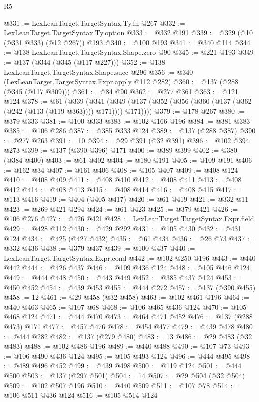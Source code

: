 \begin{lexlean}{R5}
\begin{coremodule}
@331 := LexLeanTarget.TargetSyntax.Ty.fn @267
@332 := LexLeanTarget.TargetSyntax.Ty.option
@333 := @332 @191
@339 := @329 (@10 (@331 @333) (@12 @267)) @193
@340 := @100 @193
@341 := @340 @114
@344 := @138 LexLeanTarget.TargetSyntax.Shape.zero @90
@345 := @221 @193
@349 := @137 (@344 (@345 (@117 @227)))
@352 := @138 LexLeanTarget.TargetSyntax.Shape.succ @296
@356 := @340 (LexLeanTarget.TargetSyntax.Expr.apply @112 @282)
@360 := @137 (@288 (@345 (@117 @309)))
@361 := @84 @90
@362 := @277 @361
@363 := @121 @124
@378 := @61
    (@339
      (@341 (@349 (@137 (@352 (@356 (@360 (@137 (@362 (@242 (@113 (@119 @363)))) @171)))) @171))))
@379 := @178 @267
@380 := @379 @333
@381 := @100 @333
@383 := @102 @166 @196
@384 := @381 @383
@385 := @106 @286
@387 := @385 @333 @124
@389 := @137 (@288 @387)
@390 := @277 @263
@391 := 10
@394 := @29 @391 (@32 @391)
@396 := @102 @394 @273
@399 := @137 (@390 @396) @171
@400 := @389 @399
@402 := @380 (@384 @400)
@403 := @61 @402
@404 := @180 @191
@405 := @109 @191
@406 := @162 @34
@407 := @161 @406
@408 := @105 @407
@409 := @408 @124
@410 := @408 @409
@411 := @408 @410
@412 := @408 @411
@413 := @408 @412
@414 := @408 @413
@415 := @408 @414
@416 := @408 @415
@417 := @113 @416
@419 := @404 (@405 @417)
@420 := @61 @419
@421 := @332 @11
@423 := @269 @421 @294
@424 := @61 @423
@425 := @379 @421
@426 := @106 @276
@427 := @426 @421
@428 := LexLeanTarget.TargetSyntax.Expr.field
@429 := @428 @112
@430 := @429 @292
@431 := @105 @430
@432 := @431 @124
@434 := @425 (@427 @432)
@435 := @61 @434
@436 := @26 @73
@437 := @332 @436
@438 := @379 @437
@439 := @100 @437
@440 := LexLeanTarget.TargetSyntax.Expr.cond
@442 := @102 @250 @196
@443 := @440 @442
@444 := @426 @437
@446 := @109 @436 @124
@448 := @105 @446 @124
@449 := @444 @448
@450 := @443 @449
@452 := @385 @437 @124
@453 := @450 @452
@454 := @439 @453
@455 := @444 @272
@457 := @137 (@390 @455)
@458 := 12
@461 := @29 @458 (@32 @458)
@463 := @102 @461 @196
@464 := @440 @463
@465 := @107 @68
@468 := @106 @465 @436 @124
@470 := @105 @468 @124
@471 := @444 @470
@473 := @464 @471 @452
@476 := @137 (@288 @473) @171
@477 := @457 @476
@478 := @454 @477
@479 := @439 @478
@480 := @444 @282
@482 := @137 (@279 @480)
@483 := 13
@486 := @29 @483 (@32 @483)
@488 := @102 @486 @196
@489 := @440 @488
@490 := @107 @73
@493 := @106 @490 @436 @124
@495 := @105 @493 @124
@496 := @444 @495
@498 := @489 @496 @452
@499 := @439 @498
@500 := @119 @124
@501 := @444 @500
@503 := @137 (@297 @501)
@504 := 14
@507 := @29 @504 (@32 @504)
@509 := @102 @507 @196
@510 := @440 @509
@511 := @107 @78
@514 := @106 @511 @436 @124
@516 := @105 @514 @124

\end{coremodule}
\end{lexlean}
